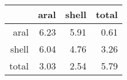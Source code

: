 \begin{table}[ht]
\centering
\begin{tabular}{rrrr}
  \hline
 & aral & shell & total \\ 
  \hline
aral & 6.23 & 5.91 & 0.61 \\ 
  shell & 6.04 & 4.76 & 3.26 \\ 
  total & 3.03 & 2.54 & 5.79 \\ 
   \hline
\end{tabular}
\end{table}
